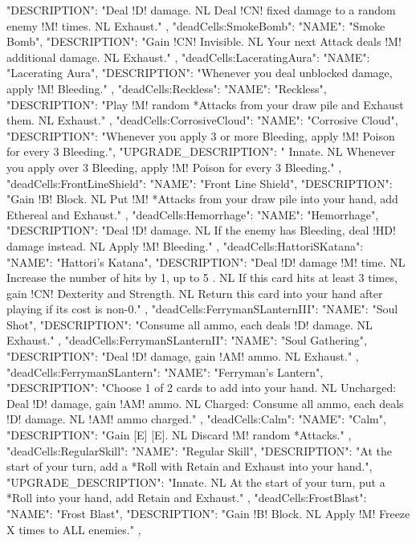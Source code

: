 {{    "DESCRIPTION": "Deal !D! damage. NL Deal !CN! fixed damage to a random enemy !M! times. NL Exhaust."
  },
  "deadCells:SmokeBomb": {
    "NAME": "Smoke Bomb",
    "DESCRIPTION": "Gain !CN! Invisible. NL Your next Attack deals !M! additional damage. NL Exhaust."
  },
  "deadCells:LaceratingAura": {
    "NAME": "Lacerating Aura",
    "DESCRIPTION": "Whenever you deal unblocked damage, apply !M! Bleeding."
  },
  "deadCells:Reckless": {
    "NAME": "Reckless",
    "DESCRIPTION": "Play !M! random *Attacks from your draw pile and Exhaust them. NL Exhaust."
  },
  "deadCells:CorrosiveCloud": {
    "NAME": "Corrosive Cloud",
    "DESCRIPTION": "Whenever you apply 3 or more Bleeding, apply !M! Poison for every 3 Bleeding.",
    "UPGRADE_DESCRIPTION": " Innate. NL Whenever you apply over 3 Bleeding, apply !M! Poison for every 3 Bleeding."
  },
  "deadCells:FrontLineShield": {
    "NAME": "Front Line Shield",
    "DESCRIPTION": "Gain !B! Block. NL Put !M! *Attacks from your draw pile into your hand, add Ethereal and Exhaust."
  },
  "deadCells:Hemorrhage": {
    "NAME": "Hemorrhage",
    "DESCRIPTION": "Deal !D! damage. NL If the enemy has Bleeding, deal !HD! damage instead. NL Apply !M! Bleeding."
  },
  "deadCells:HattoriSKatana": {
    "NAME": "Hattori's Katana",
    "DESCRIPTION": "Deal !D! damage !M! time. NL Increase the number of hits by 1, up to 5 . NL If this card hits at least 3 times, gain !CN! Dexterity and Strength. NL Return this card into your hand after playing if its cost is non-0."
  },
  "deadCells:FerrymanSLanternIII": {
    "NAME": "Soul Shot",
    "DESCRIPTION": "Consume all ammo, each deals !D! damage. NL Exhaust."
  },
  "deadCells:FerrymanSLanternII": {
    "NAME": "Soul Gathering",
    "DESCRIPTION": "Deal !D! damage, gain !AM! ammo. NL Exhaust."
  },
  "deadCells:FerrymanSLantern": {
    "NAME": "Ferryman's Lantern",
    "DESCRIPTION": "Choose 1 of 2 cards to add into your hand. NL Uncharged: Deal !D! damage, gain !AM! ammo. NL Charged: Consume all ammo, each deals !D! damage. NL !AM! ammo charged."
  },
  "deadCells:Calm": {
    "NAME": "Calm",
    "DESCRIPTION": "Gain [E] [E]. NL Discard !M! random *Attacks."
  },
  "deadCells:RegularSkill": {
    "NAME": "Regular Skill",
    "DESCRIPTION": "At the start of your turn, add a *Roll with Retain and Exhaust into your hand.",
    "UPGRADE_DESCRIPTION": "Innate. NL At the start of your turn, put a *Roll into your hand, add Retain and Exhaust."
  },
  "deadCells:FrostBlast": {
    "NAME": "Frost Blast",
    "DESCRIPTION": "Gain !B! Block. NL Apply !M! Freeze X times to ALL enemies."
  },
}
